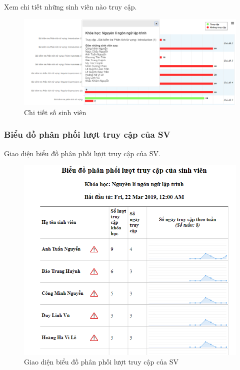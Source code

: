 \vskip 5cm
Xem chi tiết những sinh viên nào truy cập.

\begin{center}
	\begin{figure}[htp]
		\begin{center}
			\includegraphics[width=1\linewidth]{img/28}
		\end{center}
		\caption{Chi tiết số sinh viên}
		\label{refhinh60}
	\end{figure}
\end{center}

\newpage
\subsubsection{Biểu đồ phân phối lượt truy cập của SV}

Giao diện biểu đồ phân phối lượt truy cập của SV.

\begin{center}
	\begin{figure}[htp]
		\begin{center}
			\includegraphics[width=1\linewidth]{img/29}
		\end{center}
		\caption{Giao diện biểu đồ phân phối lượt truy cập của SV}
		\label{refhinh61}
	\end{figure}
\end{center}

